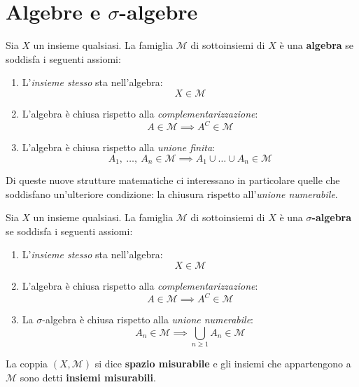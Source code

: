\section{Algebre e $\sigma$-algebre}
\begin{define}[Algebra]
	Sia $X$ un insieme qualsiasi. La famiglia $\mathcal{M}$ di sottoinsiemi di $X$ è una \textbf{algebra}  se soddisfa i seguenti assiomi:
	\begin{enumerate}
		\item L'\textit{insieme stesso} sta nell'algebra:
		\begin{equation}
			X\in\mathcal{M}
		\end{equation}
		\item L'algebra è chiusa rispetto alla \textit{complementarizzazione}: \begin{equation}
			A\in\mathcal{M}\implies A^C\in\mathcal{M}
		\end{equation}
		\item L'algebra è chiusa rispetto alla \textit{unione finita}:
		\begin{equation}
			A_1,\ \ldots,\ A_n\in\mathcal{M}\implies A_1\cup\ldots\cup A_n\in\mathcal{M}
		\end{equation}
	\end{enumerate}
\end{define}
Di queste nuove strutture matematiche ci interessano in particolare quelle che soddisfano un'ulteriore condizione: la chiusura rispetto all'\textit{unione numerabile}.
\begin{define}
	Sia $X$ un insieme qualsiasi. La famiglia $\mathcal{M}$ di sottoinsiemi di $X$ è una $\sigma$\textbf{-algebra}  se soddisfa i seguenti assiomi:
	\begin{enumerate}
		\item L'\textit{insieme stesso} sta nell'algebra:
		\begin{equation}
			X\in\mathcal{M}
		\end{equation}
		\item L'algebra è chiusa rispetto alla \textit{complementarizzazione}: \begin{equation}
			A\in\mathcal{M}\implies A^C\in\mathcal{M}
		\end{equation}
		\item La $\sigma$-algebra è chiusa rispetto alla \textit{unione numerabile}: \begin{equation}
			A_n\in\mathcal{M}\implies \bigcup_{n\geq 1}A_n\in\mathcal{M} 
		\end{equation}
	\end{enumerate}
La coppia $\left(X,\mathcal{M}\right)$ si dice \textbf{spazio misurabile} e gli insiemi che appartengono a $\mathcal{M}$ sono detti \textbf{insiemi misurabili}.
\end{define}
